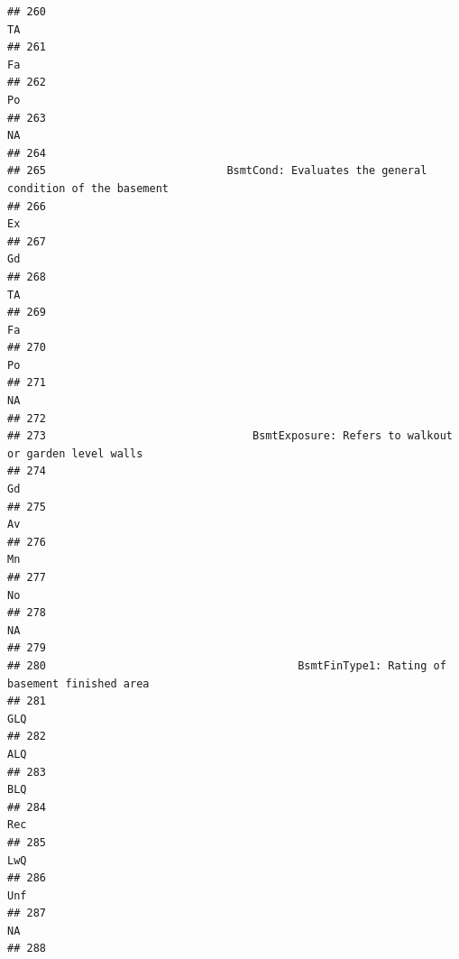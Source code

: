 \documentclass[
]{article}
\begin{document}
\begin{verbatim}
## 260                                                                                   TA
## 261                                                                                   Fa
## 262                                                                                   Po
## 263                                                                                   NA
## 264                                                                                     
## 265                            BsmtCond: Evaluates the general condition of the basement
## 266                                                                                   Ex
## 267                                                                                   Gd
## 268                                                                                   TA
## 269                                                                                   Fa
## 270                                                                                   Po
## 271                                                                                   NA
## 272                                                                                     
## 273                                BsmtExposure: Refers to walkout or garden level walls
## 274                                                                                   Gd
## 275                                                                                   Av
## 276                                                                                   Mn
## 277                                                                                   No
## 278                                                                                   NA
## 279                                                                                     
## 280                                       BsmtFinType1: Rating of basement finished area
## 281                                                                                  GLQ
## 282                                                                                  ALQ
## 283                                                                                  BLQ
## 284                                                                                  Rec
## 285                                                                                  LwQ
## 286                                                                                  Unf
## 287                                                                                   NA
## 288                                                                                     

\end{verbatim}
\end{document}
